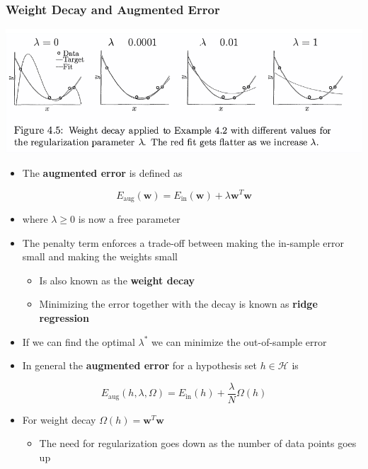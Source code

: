 \documentclass[11pt]{article}
\begin{document}
\subsubsection{Weight Decay and Augmented Error}
\label{sec:org36592bc}
\begin{center}
\includegraphics[width=.9\linewidth]{Overfitting (4)/screenshot_2018-09-18_08-20-44.png}
\end{center}
\begin{itemize}
\item The \textbf{augmented error} is defined as
\end{itemize}
\begin{equation}
  E_\text{aug}(\pmb w) = E_\text{in}(\pmb w) + \lambda \pmb w^T \pmb w
\end{equation}
\begin{itemize}
\item where \(\lambda \geq 0\) is now a free parameter

\item The penalty term enforces a trade-off between making the in-sample error small and making the weights small
\begin{itemize}
\item Is also known as the \textbf{weight decay}
\item Minimizing the error together with the decay is known as \textbf{ridge regression}
\end{itemize}

\item If we can find the optimal \(\lambda^*\) we can minimize the out-of-sample error

\item In general the \textbf{augmented error} for a hypothesis set \(h \in \mathcal H\) is
\end{itemize}
\begin{equation}
    E_\text{aug}(h,\lambda,\Omega) = E_\text{in}(h) + \frac\lambda N \Omega(h)
\end{equation}
\begin{itemize}
\item For weight decay \(\Omega(h) = \pmb w^T\pmb w\)
\begin{itemize}
\item The need for regularization goes down as the number of data points goes up
\end{itemize}
\end{itemize}
\end{document}
